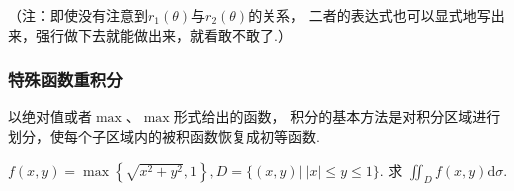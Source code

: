 （注：即使没有注意到$r_1(\theta)$与$r_2(\theta)$的关系，
二者的表达式也可以显式地写出来，强行做下去就能做出来，就看敢不敢了.）

\subsubsection{特殊函数重积分}
以绝对值或者$\mathop{max}$、$\mathop{max}$形式给出的函数，
积分的基本方法是对积分区域进行划分，使每个子区域内的被积函数恢复成初等函数.

\begin{example}
\label{ex:ch07-11}
$f ( x , y ) = \mathop{max} \left\{ \sqrt { x ^ { 2 } + y ^ { 2 } } , 1 \right\} , D = \{ ( x , y ) | ~| x | \le y \le 1 \} .$
    求 $\iint _ { D } f ( x , y ) \mathrm { d } \sigma $.
\end{example}

